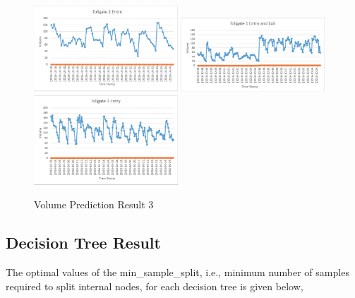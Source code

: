 \documentclass[journal, letterpaper]{IEEEtran}
\begin{document}
\begin{figure} [H]
  \centering
  \includegraphics[width=0.48\textwidth]{t2_3.png}
  \includegraphics[width=0.48\textwidth]{t1_3.png}
  \includegraphics[width=0.48\textwidth]{t3_3.png}
  \caption{Volume Prediction Result 3}
  \label{fig:15}
\end{figure}

\subsection{Decision Tree Result}
The optimal values of the min\_sample\_split, i.e., minimum number of samples required to split internal nodes, for each decision tree is given below,
\end{document}
